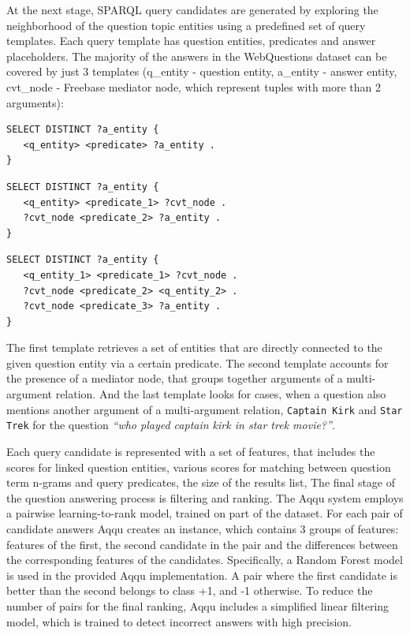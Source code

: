At the next stage, SPARQL query candidates are generated by exploring the neighborhood of the question topic entities using a predefined set of query templates.
Each query template has question entities, predicates and answer placeholders.
The majority of the answers in the WebQuestions dataset can be covered by just 3 templates (q\_entity - question entity, a\_entity - answer entity, cvt\_node - Freebase mediator node, which represent tuples with more than 2 arguments):
\\

\begin{lstlisting}[frame=single,basicstyle=\small]
SELECT DISTINCT ?a_entity {
   <q_entity> <predicate> ?a_entity .
}
\end{lstlisting}

\begin{lstlisting}[frame=single,basicstyle=\small]
SELECT DISTINCT ?a_entity {
   <q_entity> <predicate_1> ?cvt_node .
   ?cvt_node <predicate_2> ?a_entity .
}
\end{lstlisting}

\begin{lstlisting}[frame=single,basicstyle=\small]
SELECT DISTINCT ?a_entity {
   <q_entity_1> <predicate_1> ?cvt_node .
   ?cvt_node <predicate_2> <q_entity_2> .
   ?cvt_node <predicate_3> ?a_entity .
}
\end{lstlisting}

The first template retrieves a set of entities that are directly connected to the given question entity via a certain predicate.
The second template accounts for the presence of a mediator node, that groups together arguments of a multi-argument relation.
And the last template looks for cases, when a question also mentions another argument of a multi-argument relation, \eg \texttt{Captain Kirk} and \texttt{Star Trek} for the question \textit{``who played captain kirk in star trek movie?''}.

Each query candidate is represented with a set of features, that includes the scores for linked question entities, various scores for matching between question term n-grams and query predicates, the size of the results list, \etc
The final stage of the question answering process is filtering and ranking.
The Aqqu system employs a pairwise learning-to-rank model, trained on part of the dataset.
For each pair of candidate answers Aqqu creates an instance, which contains 3 groups of features: features of the first, the second candidate in the pair and the differences between the corresponding features of the candidates. Specifically, a Random Forest model is used in the provided Aqqu implementation. 
A pair where the first candidate is better than the second belongs to class +1, and -1 otherwise.
To reduce the number of pairs for the final ranking, Aqqu includes a simplified linear filtering model, which is trained to detect incorrect answers with high precision. 

